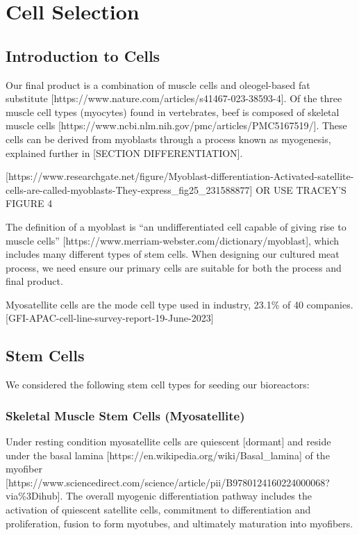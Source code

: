 \newpage
\section{Cell Selection}

\subsection{Introduction to Cells}

Our final product is a combination of muscle cells and oleogel-based fat substitute [https://www.nature.com/articles/s41467-023-38593-4]. Of the three muscle cell types (myocytes) found in vertebrates, beef is composed of skeletal muscle cells [https://www.ncbi.nlm.nih.gov/pmc/articles/PMC5167519/]. These cells can be derived from myoblasts through a process known as myogenesis, explained further in [SECTION DIFFERENTIATION]. 

[https://www.researchgate.net/figure/Myoblast-differentiation-Activated-satellite-cells-are-called-myoblasts-They-express_fig25_231588877] OR USE TRACEY’S FIGURE 4

The definition of a myoblast is “an undifferentiated cell capable of giving rise to muscle cells” [https://www.merriam-webster.com/dictionary/myoblast], which includes many different types of stem cells. When designing our cultured meat process, we need ensure our primary cells are suitable for both the process and final product. 

Myosatellite cells are the mode cell type used in industry, 23.1\% of 40 companies. [GFI-APAC-cell-line-survey-report-19-June-2023]

\subsection{Stem Cells}
We considered the following stem cell types for seeding our bioreactors:

\subsubsection*{Skeletal Muscle Stem Cells (Myosatellite)}
Under resting condition myosatellite cells are quiescent [dormant] and reside under the basal lamina [https://en.wikipedia.org/wiki/Basal_lamina] of the myofiber [https://www.sciencedirect.com/science/article/pii/B9780124160224000068?via\%3Dihub]. The overall myogenic differentiation pathway includes the activation of quiescent satellite cells, commitment to differentiation and proliferation, fusion to form myotubes, and ultimately maturation into myofibers.


